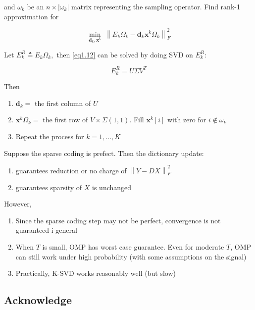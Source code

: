 \documentclass[11pt]{article}
\begin{document}
\begin{enumerate}
	and $ {\omega _k} $ be an  $n \times \left| {{\omega _k}} \right|$ matrix representing the sampling operator. Find rank-1 approximation for
	
	\begin{equation}
	\mathop {\min }\limits_{{\boldsymbol{d}_k},{\boldsymbol{x}^k}} \;\left\| {{E_k}{\Omega _k} - {\boldsymbol{d}_k}{\boldsymbol{x}^k}{\Omega _k}} \right\|_F^2
	\label{eq1.12}
	\end{equation}
	
	Let $E_k^R \triangleq {E_k}{\Omega _k},$ then \ref{eq1.12} can be solved by doing SVD on $ E_k^R $:
	
	\begin{equation}
	E_k^R = U\Sigma {V^T}
	\end{equation}
	
	Then
	\begin{enumerate}
		\item $ \boldsymbol{d}_{k} =$  the first column of $ U $ 
		\item ${\boldsymbol{x}^k}{\Omega _k}=$ the first row of $ V \times \Sigma(1,1)$. Fill $ \boldsymbol{x}^{k}[i] $ with zero for $ i \notin \omega_k $
		\item Repeat the process for $ k = 1,...,K $
	\end{enumerate}
\end{enumerate}

Suppose the sparse coding is prefect. Then the dictionary update:
\begin{enumerate}
	\item guarantees reduction or no charge of $\left\| {Y - DX} \right\|_F^2$
	\item guarantees sparsity of $ X $ is unchanged
\end{enumerate}

However,
\begin{enumerate}
	\item Since the sparse coding step may not be perfect, convergence is not guaranteed i general
	\item When $ T $ is small, OMP has worst case guarantee. Even for moderate $ T $, OMP can still work under high probability (with some assumptions on the signal)
	\item Practically, K-SVD works reasonably well (but slow)
\end{enumerate}

\subsection{Acknowledge}
\end{document}

